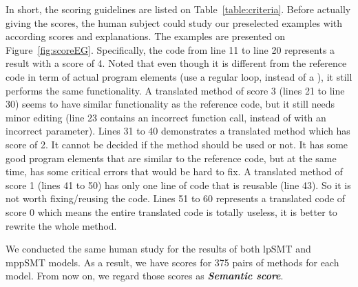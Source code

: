 In short, the scoring guidelines are listed on
Table~\ref{table:criteria}. Before actually giving the scores, the
human subject could study our preselected examples with according
scores and explanations. The examples are presented on
Figure~\ref{fig:scoreEG}. Specifically, the code from line 11 to line
20 represents a result with a score of 4. Noted that even though it is
different from the reference code in term of actual program elements
(use a regular  loop, instead of a ), it still
performs the same functionality. A translated method of score 3 (lines
21 to line 30) seems to have similar functionality as the reference
code, but it still needs minor editing (line 23 contains an incorrect
function call,  instead of  with an
incorrect parameter). Lines 31 to 40 demonstrates a translated method
which has score of 2. It cannot be decided if the method should be
used or not. It has some good program elements that are similar to the
reference code, but at the same time, has some critical errors that
would be hard to fix. A translated method of score 1 (lines 41 to 50)
has only one line of code that is reusable (line 43). So it is not
worth fixing/reusing the code. Lines 51 to 60 represents a translated
code of score 0 which means the entire translated code is totally
useless, \ie it is better to rewrite the whole method.


We conducted the same human study for the results of both lpSMT and mppSMT models. As a result, we have scores for 375 pairs of methods for each model. From now on, we regard those scores as \textbf{{\em Semantic score}}.

